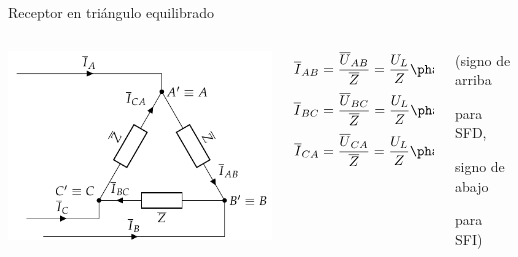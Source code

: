 \documentclass[aspectratio=169, usenames,svgnames,dvipsnames]{beamer}
\begin{document}
\begin{frame}{Receptor en triángulo equilibrado}
    \begin{columns}
    \begin{column}{0.5\columnwidth}
            \includegraphics[width=.9\linewidth]{../figs/TrianguloEquilibrado_Receptor.pdf}
    \end{column}
    
    \begin{column}{0.5\columnwidth}
        \vspace{-2mm}
        \begin{columns}
        \begin{column}{0.5\columnwidth}
            \begin{align*}
              \overline{I}_{AB} &= \frac{\overline{U}_{AB}}{\overline{Z}} = \frac{U_L}{Z}\phase{\ang{\pm 120} - \theta} \\[2pt]
              \overline{I}_{BC} &= \frac{\overline{U}_{BC}}{\overline{Z}} = \frac{U_L}{Z}\phase{0 - \theta}\\[2pt]
              \overline{I}_{CA} &= \frac{\overline{U}_{CA}}{\overline{Z}} = \frac{U_L}{Z}\phase{\ang{\mp 120} - \theta}
            \end{align*}
        \end{column}
        \begin{column}{0.5\columnwidth}
            \begin{center}
                \footnotesize{(signo de arriba 
                
                para \alert{SFD},
                
                signo de abajo 
                
                para \alert{SFI})}
            \end{center}
        \end{column}
        \end{columns}


\end{column}
\end{columns}
\end{frame}
\end{document}
